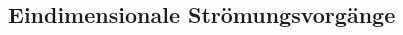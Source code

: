 \documentclass[twocolumn]{article}
\begin{document}
\pagebreak
\begin{multicols}{2}

%                                                                             

\section{Eindimensionale Strömungsvorgänge}


\end{multicols}
\end{document}
